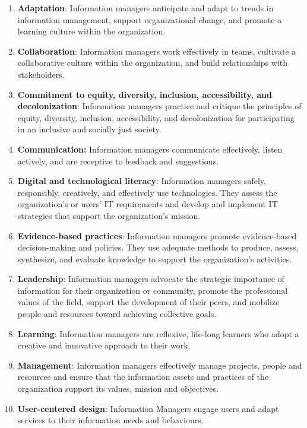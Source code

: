 \documentclass[
  letterpaper,
  DIV=11,
  numbers=noendperiod]{scrreprt}
\begin{document}
\begin{enumerate}
\def\labelenumi{\arabic{enumi}.}
\item
  \textbf{Adaptation}: Information managers anticipate and adapt to
  trends in information management, support organizational change, and
  promote a learning culture within the organization.
\item
  \textbf{Collaboration}: Information managers work effectively in
  teams, cultivate a collaborative culture within the organization, and
  build relationships with stakeholders.
\item
  \textbf{Commitment to equity, diversity, inclusion, accessibility, and
  decolonization}: Information managers practice and critique the
  principles of equity, diversity, inclusion, accessibility, and
  decolonization for participating in an inclusive and socially just
  society.
\item
  \textbf{Communication:} Information managers communicate effectively,
  listen actively, and are receptive to feedback and suggestions.
\item
  \textbf{Digital and technological literacy}: Information managers
  safely, responsibly, creatively, and effectively use technologies.
  They assess the organization's or users' IT requirements and develop
  and implement IT strategies that support the organization's mission.
\item
  \textbf{Evidence-based practices}: Information managers promote
  evidence-based decision-making and policies. They use adequate methods
  to produce, assess, synthesize, and evaluate knowledge to support the
  organization's activities.
\item
  \textbf{Leadership}: Information managers advocate the strategic
  importance of information for their organization or community, promote
  the professional values of the field, support the development of their
  peers, and mobilize people and resources toward achieving collective
  goals.
\item
  \textbf{Learning}: Information managers are reflexive, life-long
  learners who adopt a creative and innovative approach to their work.
\item
  \textbf{Management}: Information managers effectively manage projects,
  people and resources and ensure that the information assets and
  practices of the organization support its values, mission and
  objectives.
\item
  \textbf{User-centered design}: Information Managers engage users and
  adapt services to their information needs and behaviours.
\end{enumerate}
\end{document}

